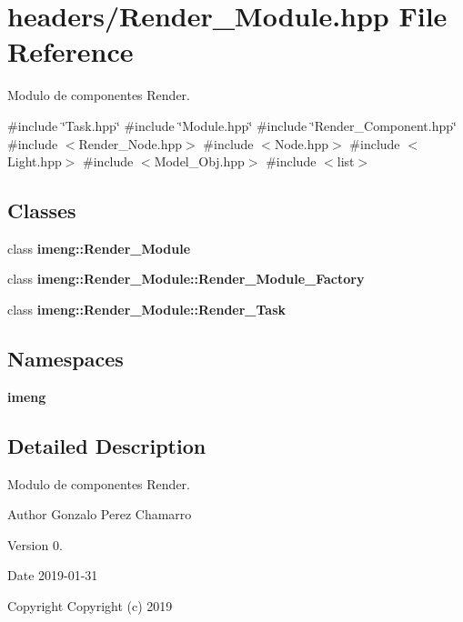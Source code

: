 \section{headers/\+Render\+\_\+\+Module.hpp File Reference}
\label{_render___module_8hpp}


Modulo de componentes Render.  


{\ttfamily \#include \char`\"{}Task.\+hpp\char`\"{}}\newline
{\ttfamily \#include \char`\"{}Module.\+hpp\char`\"{}}\newline
{\ttfamily \#include \char`\"{}Render\+\_\+\+Component.\+hpp\char`\"{}}\newline
{\ttfamily \#include $<$Render\+\_\+\+Node.\+hpp$>$}\newline
{\ttfamily \#include $<$Node.\+hpp$>$}\newline
{\ttfamily \#include $<$Light.\+hpp$>$}\newline
{\ttfamily \#include $<$Model\+\_\+\+Obj.\+hpp$>$}\newline
{\ttfamily \#include $<$list$>$}\newline
\subsection*{Classes}
\begin{DoxyCompactItemize}
\item 
class \textbf{ imeng\+::\+Render\+\_\+\+Module}
\item 
class \textbf{ imeng\+::\+Render\+\_\+\+Module\+::\+Render\+\_\+\+Module\+\_\+\+Factory}
\item 
class \textbf{ imeng\+::\+Render\+\_\+\+Module\+::\+Render\+\_\+\+Task}
\end{DoxyCompactItemize}
\subsection*{Namespaces}
\begin{DoxyCompactItemize}
\item 
 \textbf{ imeng}
\end{DoxyCompactItemize}


\subsection{Detailed Description}
Modulo de componentes Render. 

\begin{DoxyAuthor}{Author}
Gonzalo Perez Chamarro 
\end{DoxyAuthor}
\begin{DoxyVersion}{Version}
0. 
\end{DoxyVersion}
\begin{DoxyDate}{Date}
2019-\/01-\/31
\end{DoxyDate}
\begin{DoxyCopyright}{Copyright}
Copyright (c) 2019 
\end{DoxyCopyright}
